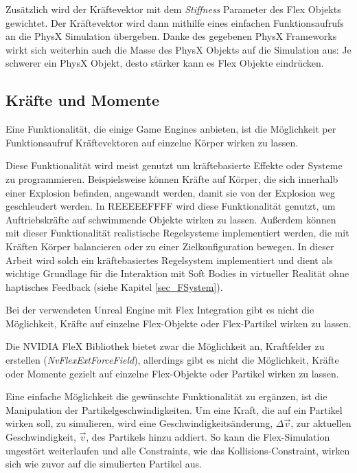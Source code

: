 Zusätzlich wird der Kräftevektor mit dem \textit{Stiffness} Parameter des Flex Objekts gewichtet.
Der Kräftevektor wird dann mithilfe eines einfachen Funktionsaufrufs an die PhysX Simulation übergeben. Danke des gegebenen PhysX Frameworks wirkt sich weiterhin auch die Masse des PhysX Objekts auf die Simulation aus: Je schwerer ein PhysX Objekt, desto stärker kann es Flex Objekte eindrücken.

\subsection{Kräfte und Momente}

Eine Funktionalität, die einige Game Engines anbieten, ist die Möglichkeit per Funktionsaufruf Kräftevektoren auf einzelne Körper wirken zu lassen. 

Diese Funktionalität wird meist genutzt um kräftebasierte Effekte oder Systeme zu programmieren. Beispielsweise können Kräfte auf Körper, die sich innerhalb einer Explosion befinden, angewandt werden, damit sie von der Explosion weg geschleudert werden. In REEEEEFFFF wird diese Funktionalität genutzt, um Auftriebskräfte auf schwimmende Objekte wirken zu lassen. 
Außerdem können mit dieser Funktionalität realistische Regelsysteme implementiert werden, die mit Kräften Körper balancieren oder zu einer Zielkonfiguration bewegen. In dieser Arbeit wird solch ein kräftebasiertes Regelsystem implementiert und dient als wichtige Grundlage für die Interaktion mit Soft Bodies in virtueller Realität ohne haptisches Feedback (siehe Kapitel \ref{sec_FSystem}).

Bei der verwendeten Unreal Engine mit Flex Integration gibt es nicht die Möglichkeit, Kräfte auf einzelne Flex-Objekte oder Flex-Partikel wirken zu lassen.

Die NVIDIA FleX Bibliothek bietet zwar die Möglichkeit an, Kraftfelder zu erstellen (\textit{NvFlexExtForceField}), allerdings gibt es nicht die Möglichkeit, Kräfte oder Momente gezielt auf einzelne Flex-Objekte oder Partikel wirken zu lassen. %

Eine einfache Möglichkeit die gewünschte Funktionalität zu ergänzen, ist die Manipulation der Partikelgeschwindigkeiten. Um eine Kraft, die auf ein Partikel wirken soll, zu simulieren, wird eine Geschwindigkeitsänderung, $\Delta\vec{v}$, zur aktuellen Geschwindigkeit, $\vec{v}$, des Partikels hinzu addiert. So kann die Flex-Simulation ungestört weiterlaufen und alle Constraints, wie das Kollisions-Constraint, wirken sich wie zuvor auf die simulierten Partikel aus.

